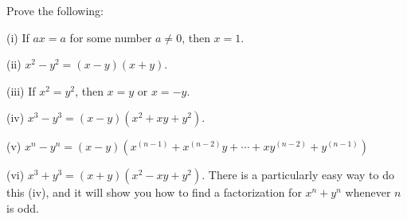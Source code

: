 \begin{tcolorbox}[title=Problem 1, breakable]
    Prove the following: 

    (i) If $ax = a$ for some number $a \not = 0$, then $x = 1$.

    (ii) $x^2 - y^2 = (x - y)(x + y)$.

    (iii) If $x^2 = y^2$, then $x = y$ or $x = -y$.

    (iv) $x^3 - y^3 = (x - y)(x^2 + xy + y^2)$.

    (v) $x^n - y^n = (x - y)(x^{(n - 1)} + x^{(n - 2)}y + \cdots + xy^{(n - 2)} + y^{(n - 1)})$

    (vi) $x^3 + y^3 = (x + y)(x^2 - xy + y^2)$. There is a particularly
    easy way to do this (iv), and it will show you how to find a factorization
    for $x^n + y^n$ whenever $n$ is odd.
\end{tcolorbox}

